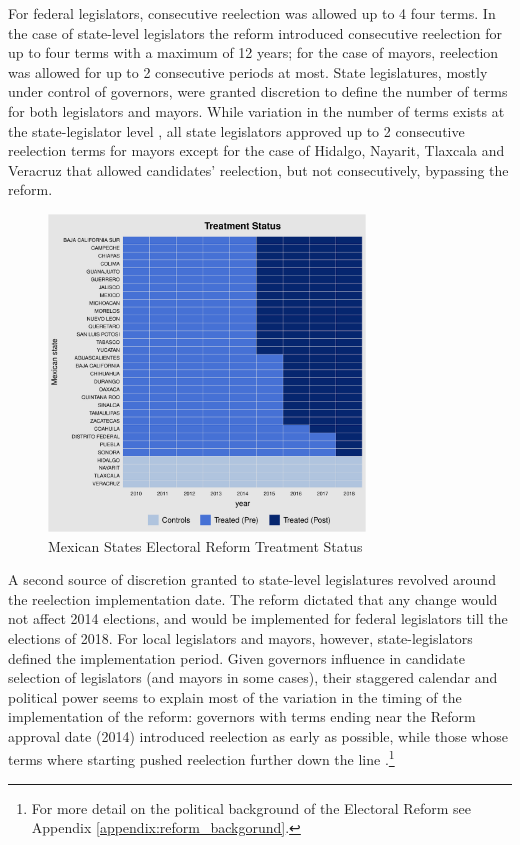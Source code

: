 \documentclass[12pt]{amsart}
\numberwithin{equation}{section}
\theoremstyle{definition}
\theoremstyle{definition}
\theoremstyle{definition}
\begin{document}
For federal legislators, consecutive reelection was allowed up to 4 four terms. In the case of state-level legislators the reform introduced consecutive reelection for up to four terms with a maximum of 12 years; for the case of mayors, reelection was allowed for up to 2 consecutive periods at most. State legislatures, mostly under control of governors, were granted discretion to define the number of terms for both legislators and mayors. While variation in the number of terms exists at the state-legislator level \citep{motolinia_2020}, all state legislators approved up to 2 consecutive reelection terms for mayors except for the case of Hidalgo, Nayarit, Tlaxcala and Veracruz that allowed candidates' reelection, but not consecutively, bypassing the reform.  

\begin{figure}[H]   
\centering 
\caption{Mexican States Electoral Reform Treatment Status}
\label{fig:treatment_status}
\includegraphics[width=0.75\textwidth]{Figures/reform_treatmentstatus.pdf}     
\captionsetup{justification=centering} 
\end{figure}   

 
A second source of discretion granted to state-level legislatures revolved around the reelection implementation date. The reform dictated that any change would not affect 2014 elections, and would be implemented for federal legislators till the elections of 2018. For local legislators and mayors, however, state-legislators defined the implementation period. Given governors influence in candidate selection of legislators (and mayors in some cases), their staggered calendar and political power seems to explain most of the variation in the timing of the implementation of the reform: governors with terms ending near the Reform approval date (2014) introduced reelection as early as possible, while those whose terms where starting pushed reelection further down the line \citep{motolinia_2020}.\footnote{For more detail on the political background of the Electoral Reform see Appendix \ref{appendix:reform_backgorund}.}
   
\end{document}
